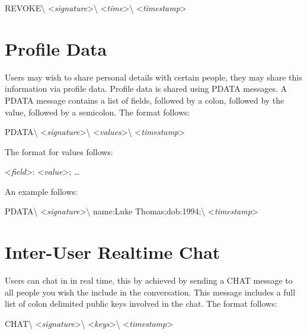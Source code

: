 \begin{center}
REVOKE\textbackslash
\textless \textit{signature}\textgreater\textbackslash
\textless \textit{time}\textgreater\textbackslash
\textless \textit{timestamp}\textgreater
\end{center}

\section{Profile Data}
Users may wish to share personal details with certain people, they may share
this information via profile data. Profile data is shared using PDATA messages.
A PDATA message contains a list of fields, followed by a colon, followed by the
value, followed by a semicolon. The format follows:

\begin{center}
PDATA\textbackslash
\textless \textit{signature}\textgreater\textbackslash
\textless \textit{values}\textgreater\textbackslash
\textless \textit{timestamp}\textgreater
\end{center}

The format for values follows:

\begin{center}
\textless \textit{field}\textgreater:
\textless \textit{value}\textgreater;
\ldots
\end{center}

An example follows:

\begin{center}
PDATA\textbackslash
\textless \textit{signature}\textgreater\textbackslash
name:Luke Thomas;dob:1994;\textbackslash
\textless \textit{timestamp}\textgreater
\end{center}

\section{Inter-User Realtime Chat}
Users can chat in in real time, this by achieved by sending a CHAT message to
all people you wish the include in the conversation. This message includes a
full list of colon delimited public keys involved in the chat. The format
follows:

\begin{center}
CHAT\textbackslash
\textless \textit{signature}\textgreater\textbackslash
\textless \textit{keys}\textgreater\textbackslash
\textless \textit{timestamp}\textgreater
\end{center}

